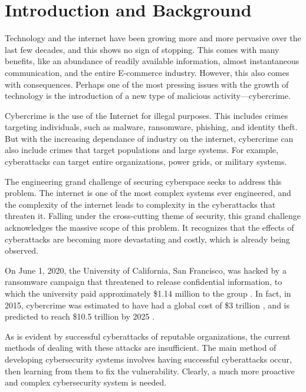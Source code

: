 \section{Introduction and Background}
Technology and the internet have been growing more and more pervasive over the last few decades, and this shows no sign of stopping.
This comes with many benefits, like an abundance of readily available information, almost instantaneous communication, and the entire E-commerce industry.
However, this also comes with consequences.
Perhaps one of the most pressing issues with the growth of technology is the introduction of a new type of malicious activity---cybercrime.

Cybercrime is the use of the Internet for illegal purposes.
This includes crimes targeting individuals, such as malware, ransomware, phishing, and identity theft.
But with the increasing dependance of industry on the internet, cybercrime can also include crimes that target populations and large systems.
For example, cyberattacks can target entire organizations, power grids, or military systems.

The engineering grand challenge of securing cyberspace seeks to address this problem.
The internet is one of the most complex systems ever engineered, and the complexity of the internet leads to complexity in the cyberattacks that threaten it.
Falling under the cross-cutting theme of security, this grand challenge acknowledges the massive scope of this problem.
It recognizes that the effects of cyberattacks are becoming more devastating and costly, which is already being observed.

On June 1, 2020, the University of California, San Francisco, was hacked by a ransomware campaign that threatened to release confidential information, to which the university paid approximately \$1.14 million to the group \cite{winder2020}.
In fact, in 2015, cybercrime was estimated to have had a global cost of \$3 trillion \cite{microsoft2016}, and is predicted to reach \$10.5 trillion by 2025 \cite{morgan2020}.

As is evident by successful cyberattacks of reputable organizations, the current methods of dealing with these attacks are insufficient.
The main method of developing cybersecurity systems involves having successful cyberattacks occur, then learning from them to fix the vulnerability.
Clearly, a much more proactive and complex cybersecurity system is needed.
